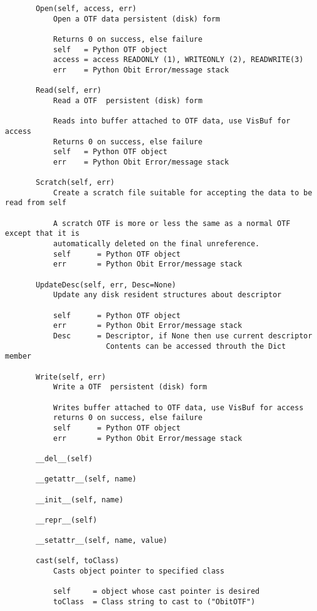\documentclass[11pt]{report}
\begin{document}
\begin{verbatim}
       Open(self, access, err)
           Open a OTF data persistent (disk) form
           
           Returns 0 on success, else failure
           self   = Python OTF object
           access = access READONLY (1), WRITEONLY (2), READWRITE(3)
           err    = Python Obit Error/message stack
       
       Read(self, err)
           Read a OTF  persistent (disk) form
           
           Reads into buffer attached to OTF data, use VisBuf for access
           Returns 0 on success, else failure
           self   = Python OTF object
           err    = Python Obit Error/message stack
       
       Scratch(self, err)
           Create a scratch file suitable for accepting the data to be read from self
           
           A scratch OTF is more or less the same as a normal OTF except that it is
           automatically deleted on the final unreference.
           self      = Python OTF object
           err       = Python Obit Error/message stack
       
       UpdateDesc(self, err, Desc=None)
           Update any disk resident structures about descriptor
           
           self      = Python OTF object
           err       = Python Obit Error/message stack
           Desc      = Descriptor, if None then use current descriptor
                       Contents can be accessed throuth the Dict member
       
       Write(self, err)
           Write a OTF  persistent (disk) form
           
           Writes buffer attached to OTF data, use VisBuf for access
           returns 0 on success, else failure
           self      = Python OTF object
           err       = Python Obit Error/message stack
       
       __del__(self)
       
       __getattr__(self, name)
       
       __init__(self, name)
       
       __repr__(self)
       
       __setattr__(self, name, value)
       
       cast(self, toClass)
           Casts object pointer to specified class
           
           self     = object whose cast pointer is desired
           toClass  = Class string to cast to ("ObitOTF")
       

\end{verbatim}
\end{document}
